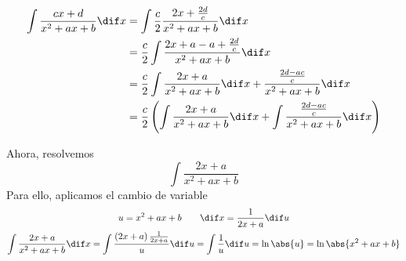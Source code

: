 \documentclass[a4paper]{article}
\begin{document}
\[
\begin{aligned}
    \int \frac{cx+d}{x^2+ax+b} \dif x &= \int \frac{c}{2} \frac{2x+\frac{2d}{c}}{x^2+ax+b} \dif x \\
    &= \frac{c}{2} \int \frac{2x+a-a+ \frac{2d}{c}}{x^2+ax+b} \dif x \\
    &= \frac{c}{2} \int \frac{2x+a}{x^2+ax+b}\dif x + \frac{\frac{2d - ac}{c}}{x^2+ax+b}\dif x \\
    &= \frac{c}{2} \left( \int \frac{2x+a}{x^2+ax+b}\dif x + \int \frac{\frac{2d - ac}{c}}{x^2+ax+b}\dif x \right)
\end{aligned}\]

Ahora, resolvemos
\[
    \int \frac{2x+a}{x^2+ax+b}
\]
Para ello, aplicamos el cambio de variable
\begin{gather*}
    u = x^2 + ax + b \qquad \dif x = \frac{1}{2x+a} \dif u \\
    \int \frac{2x+a}{x^2+ax+b} \dif x = \int \frac{\left( 2x+a \right) \frac{1}{2x+a}}{u}  \dif u =
    \int \frac{1}{u} \dif u  = \ln \abs{u} = \ln \abs{x^2+ax+b}
\end{gather*}
\end{document}
